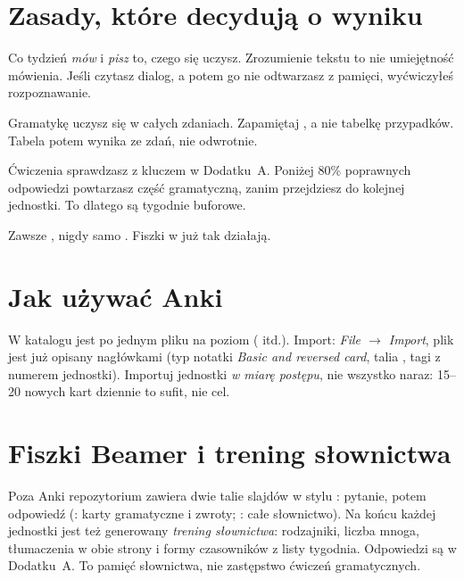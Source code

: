 \section*{Zasady, które decydują o wyniku}

\begin{zasada}
Co tydzień \emph{mów} i \emph{pisz} to, czego się uczysz. Zrozumienie tekstu to nie umiejętność
mówienia. Jeśli czytasz dialog, a potem go nie odtwarzasz z pamięci, wyćwiczyłeś rozpoznawanie.
\end{zasada}

\begin{zasada}
Gramatykę uczysz się w całych zdaniach. Zapamiętaj , a nie
tabelkę przypadków. Tabela potem wynika ze zdań, nie odwrotnie.
\end{zasada}

\begin{zasada}
Ćwiczenia sprawdzasz z kluczem w Dodatku~A. Poniżej 80\% poprawnych odpowiedzi powtarzasz
część gramatyczną, zanim przejdziesz do kolejnej jednostki. To dlatego są tygodnie buforowe.
\end{zasada}

\begin{zasada}
Zawsze , nigdy samo . Fiszki w  już tak działają.
\end{zasada}

\section*{Jak używać Anki}

W katalogu  jest po jednym pliku na poziom ( itd.). Import:
\emph{File $\rightarrow$ Import}, plik jest już opisany nagłówkami (typ notatki \emph{Basic and
reversed card}, talia , tagi z numerem jednostki). Importuj jednostki \emph{w
miarę postępu}, nie wszystko naraz: 15--20 nowych kart dziennie to sufit, nie cel.

\section*{Fiszki Beamer i trening słownictwa}

Poza Anki repozytorium zawiera dwie talie slajdów w stylu : pytanie, potem odpowiedź (: karty gramatyczne
i zwroty; : całe słownictwo). Na końcu każdej jednostki jest też generowany \emph{trening słownictwa}: rodzajniki, liczba mnoga,
tłumaczenia w obie strony i formy czasowników z listy tygodnia. Odpowiedzi są w Dodatku~A. To pamięć słownictwa, nie zastępstwo ćwiczeń gramatycznych.

